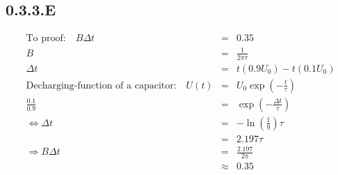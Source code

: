 \subsection{0.3.3.E}
\begin{eqnarray*}
	\text{To proof:} \quad B\Delta t&=&0.35\\
	B&=&\frac{1}{2\pi\tau}\\
	\Delta t&=&t(0.9U_0)-t(0.1U_0)\\
	\text{Decharging-function of a capacitor:} \quad U(t)&=&U_0\exp\left(-\frac{t}{\tau}\right)\\
	\frac{0.1}{0.9}&=&\exp\left(-\frac{\Delta t}{\tau}\right)\\
	\Leftrightarrow\Delta t&=&-\ln\left(\frac{1}{9}\right)\tau\\
	&=&2.197\tau\\
	\Rightarrow B\Delta t&=&\frac{2.197}{2\pi}\\
	&\approx&0.35
\end{eqnarray*}
